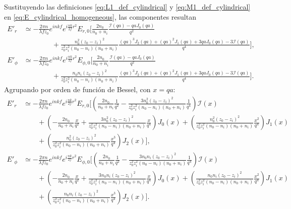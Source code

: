 Sustituyendo las definiciones \eqref{eq:L1_def_cylindrical} y \eqref{eq:M1_def_cylindrical} en \eqref{eq:E_cylindrical_homogeneous}, las componentes resultan
\begin{equation}
\begin{aligned}
E'_r
&\simeq
-\frac{2\pi n}{\lambda f z_0}
e^{inkf}
e^{i\frac{nk}{2f}r^2}
E_{r,0}
\Bigg[
\frac{2n_0}{n_0+n_i}
\frac{\mathcal I(qa)-qaJ_0(qa)}{q^2}
\\
&\qquad\qquad
+
\frac{
n_0^2(z_0-z_i)^2
}{
z_0^2z_i^2(n_0-n_i)(n_0+n_i)
}
\frac{
(qa)^3J_2(qa)
+
(qa)^2J_1(qa)
+
3qaJ_0(qa)
-
3\mathcal I(qa)
}{q^4}
\Bigg],
\\[0.4em]
E'_\phi
&\simeq
-\frac{2\pi n}{\lambda f z_0}
e^{inkf}
e^{i\frac{nk}{2f}r^2}
E_{\phi,0}
\Bigg[
\frac{2n_0}{n_0+n_i}
\frac{\mathcal I(qa)-qaJ_0(qa)}{q^2}
\\
&\qquad\qquad
+
\frac{
n_0n_i(z_0-z_i)^2
}{
z_0^2z_i^2(n_0-n_i)(n_0+n_i)
}
\frac{
(qa)^3J_2(qa)
+
(qa)^2J_1(qa)
+
3qaJ_0(qa)
-
3\mathcal I(qa)
}{q^4}
\Bigg].
\end{aligned}
\label{eq:E_cylindrical_homogeneous_explicit}
\end{equation}
Agrupando por orden de función de Bessel, con $x = qa$:
\begin{equation}
\begin{aligned}
E'_r
&\simeq
-\frac{2\pi n}{\lambda f z_0}
e^{inkf}
e^{i\frac{nk}{2f}r^2}
E_{r,0}
\Bigg[
\left(
\frac{2n_0}{n_0+n_i}\frac{1}{q^2}
-
\frac{3n_0^2(z_0-z_i)^2}{z_0^2z_i^2(n_0-n_i)(n_0+n_i)}\frac{1}{q^4}
\right)\mathcal I(x)
\\
&\qquad
+
\left(
-\frac{2n_0}{n_0+n_i}\frac{x}{q^2}
+
\frac{3n_0^2(z_0-z_i)^2}{z_0^2z_i^2(n_0-n_i)(n_0+n_i)}\frac{x}{q^4}
\right)J_0(x)
+
\left(
\frac{n_0^2(z_0-z_i)^2}{z_0^2z_i^2(n_0-n_i)(n_0+n_i)}\frac{x^2}{q^4}
\right)J_1(x)
\\
&\qquad
+
\left(
\frac{n_0^2(z_0-z_i)^2}{z_0^2z_i^2(n_0-n_i)(n_0+n_i)}\frac{x^3}{q^4}
\right)J_2(x)
\Bigg],
\\[0.6em]
E'_\phi
&\simeq
-\frac{2\pi n}{\lambda f z_0}
e^{inkf}
e^{i\frac{nk}{2f}r^2}
E_{\phi,0}
\Bigg[
\left(
\frac{2n_0}{n_0+n_i}\frac{1}{q^2}
-
\frac{3n_0n_i(z_0-z_i)^2}{z_0^2z_i^2(n_0-n_i)(n_0+n_i)}\frac{1}{q^4}
\right)\mathcal I(x)
\\
&\qquad
+
\left(
-\frac{2n_0}{n_0+n_i}\frac{x}{q^2}
+
\frac{3n_0n_i(z_0-z_i)^2}{z_0^2z_i^2(n_0-n_i)(n_0+n_i)}\frac{x}{q^4}
\right)J_0(x)
+
\left(
\frac{n_0n_i(z_0-z_i)^2}{z_0^2z_i^2(n_0-n_i)(n_0+n_i)}\frac{x^2}{q^4}
\right)J_1(x)
\\
&\qquad
+
\left(
\frac{n_0n_i(z_0-z_i)^2}{z_0^2z_i^2(n_0-n_i)(n_0+n_i)}\frac{x^3}{q^4}
\right)J_2(x)
\Bigg].
\end{aligned}
\label{eq:E_cylindrical_homogeneous_grouped_bessel}
\end{equation}

